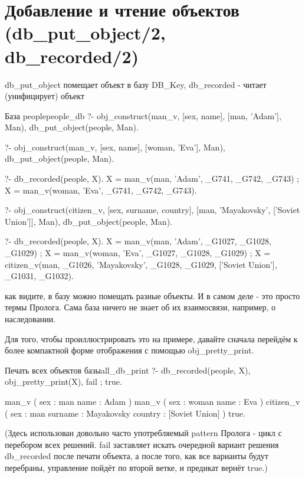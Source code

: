 \documentclass[a4paper]{book}
\begin{document}
\section{Добавление и чтение объектов (db\_put\_object/2,
  db\_recorded/2)}
\label{db_put_object/2}
\label{db_recorded/2}

db\_put\_object помещает объект в базу DB\_Key, db\_recorded -
читает (унифицирует) объект

\begin{example}{База people}{people_db}
?- obj_construct(man_v, 
      [sex, name], 
      [man, 'Adam'], Man), 
   db_put_object(people, Man).

?- obj_construct(man_v, 
      [sex, name], 
      [woman, 'Eva'], Man), 
   db_put_object(people, Man).

?- db_recorded(people, X).
X = man_v(man, 'Adam', _G741, _G742, _G743) ;
X = man_v(woman, 'Eva', _G741, _G742, _G743).

?- obj_construct(citizen_v, 
      [sex, surname, country], 
      [man, 'Mayakovsky', ['Soviet Union']], Man), 
   db_put_object(people, Man). 

?- db_recorded(people, X).
X = man_v(man, 'Adam', _G1027, _G1028, _G1029) ;
X = man_v(woman, 'Eva', _G1027, _G1028, _G1029) ;
X = citizen_v(man, _G1026, 'Mayakovsky', _G1028, _G1029, ['Soviet Union'], _G1031, _G1032).
\end{example}

как видите, в базу можно помещать разные объекты. И в самом деле
- это просто термы Пролога. Сама база ничего не знает об их
взаимосвязи, например, о наследовании.

Для того, чтобы проиллюстрировать это на примере, давайте сначала
перейдём к более компактной форме отображения с помощью
obj\_pretty\_print. 

\begin{example}{Печать всех объектов базы}{all_db_print}
?- db_recorded(people, X), 
   obj_pretty_print(X), 
   fail ; true.

man_v ( 
  sex : man 
  name : Adam 
) 
man_v ( 
  sex : woman 
  name : Eva 
) 
citizen_v ( 
  sex : man 
  surname : Mayakovsky 
  country : [Soviet Union] 
) 
true.
\end{example}

(Здесь использован довольно часто употребляемый pattern Пролога -
цикл с перебором всех решений. fail заставляет искать очередной
вариант решения db\_recorded после печати объекта, а после того,
как все варианты будут перебраны, управление пойдёт по второй
ветке, и предикат вернёт true.)
\end{document}

